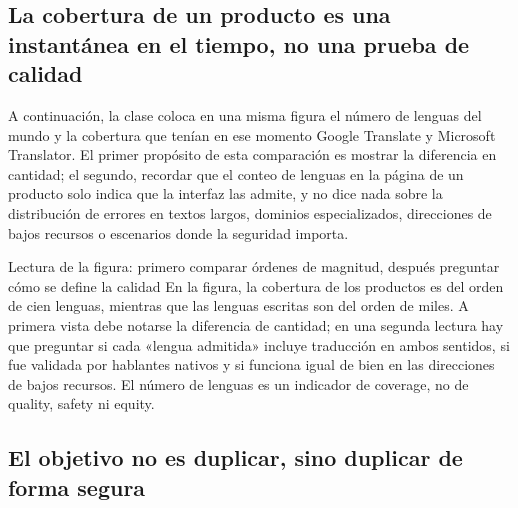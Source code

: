 
\subsection{La cobertura de un producto es una instantánea en el tiempo, no una prueba de calidad}

A continuación, la clase coloca en una misma figura el número de lenguas del mundo y la cobertura que tenían en ese momento Google Translate y Microsoft Translator. El primer propósito de esta comparación es mostrar la diferencia en cantidad; el segundo, recordar que el conteo de lenguas en la página de un producto solo indica que la interfaz las admite, y no dice nada sobre la distribución de errores en textos largos, dominios especializados, direcciones de bajos recursos o escenarios donde la seguridad importa.


\begin{knowledgebox}{Lectura de la figura: primero comparar órdenes de magnitud, después preguntar cómo se define la calidad}
En la figura, la cobertura de los productos es del orden de cien lenguas, mientras que las lenguas escritas son del orden de miles. A primera vista debe notarse la diferencia de cantidad; en una segunda lectura hay que preguntar si cada «lengua admitida» incluye traducción en ambos sentidos, si fue validada por hablantes nativos y si funciona igual de bien en las direcciones de bajos recursos. El número de lenguas es un indicador de coverage, no de quality, safety ni equity.
\end{knowledgebox}


\subsection{El objetivo no es duplicar, sino duplicar de forma segura}

